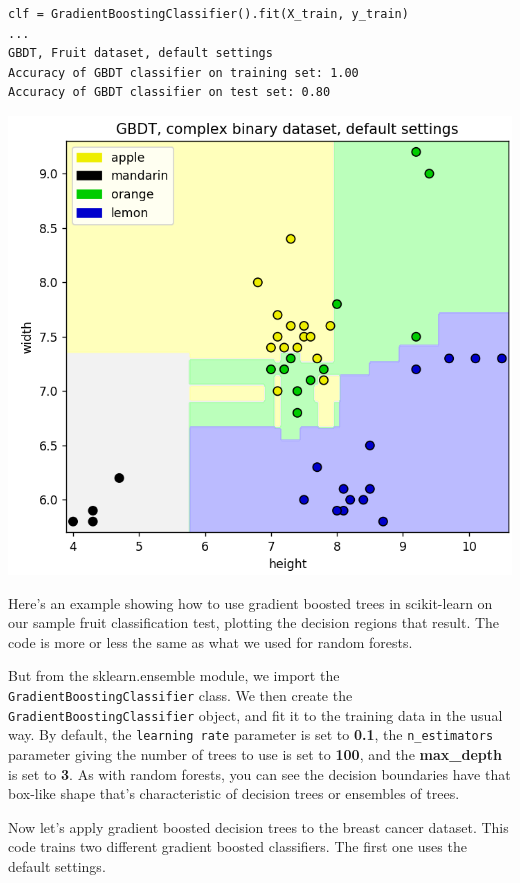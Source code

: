 \begin{multicols}{2}
{\begin{verbatim}
clf = GradientBoostingClassifier().fit(X_train, y_train)
...
GBDT, Fruit dataset, default settings
Accuracy of GBDT classifier on training set: 1.00
Accuracy of GBDT classifier on test set: 0.80
\end{verbatim}
}


\begin{center}
	\includegraphics[width=\linewidth]{img/GBDT-4.png} 
\end{center}

Here's an example showing how to use gradient boosted trees in scikit-learn on our sample fruit classification test, plotting the decision regions that result. The code is more or less the same as what we used for random forests. 

But from the sklearn.ensemble module, we import the \texttt{GradientBoostingClassifier} class. We then create the \texttt{GradientBoostingClassifier} object, and fit it to the training data in the usual way. By default, the \texttt{learning rate} parameter is set to \textbf{0.1}, the \texttt{n_estimators} parameter giving the number of trees to use is set to \textbf{100}, and the \textbf{max_depth} is set to \textbf{3}. As with random forests, you can see the decision boundaries have that box-like shape that's characteristic of decision trees or ensembles of trees. 

Now let's apply gradient boosted decision trees to the breast cancer dataset. This code trains two different gradient boosted classifiers. The first one uses the default settings. 


\end{multicols}
